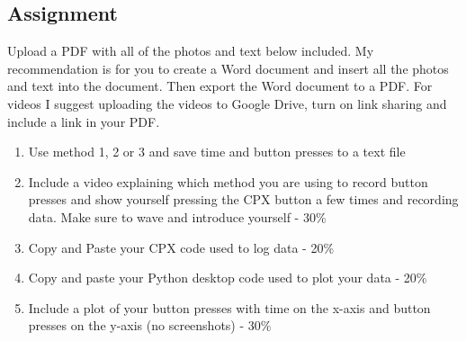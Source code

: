 \subsection{Assignment}

Upload a PDF with all of the photos and text below included. My
recommendation is for you to create a Word document and insert all the
photos and text into the document. Then export the Word document to a
PDF. For videos I suggest uploading the videos to Google Drive, turn
on link sharing and include a link in your PDF.
\begin{enumerate}[itemsep=-5pt]
\item Use method 1, 2 or 3 and save time and button presses to a text file
\item Include a video explaining which method you are using to record button presses and show yourself pressing the CPX button a few times and recording data. Make sure to wave and introduce yourself - 30\%
\item Copy and Paste your CPX code used to log data - 20\%
\item Copy and paste your Python desktop code used to plot your data - 20\%
\item Include a plot of your button presses with time on the x-axis and button presses on the y-axis (no screenshots) - 30\%
\end{enumerate}
